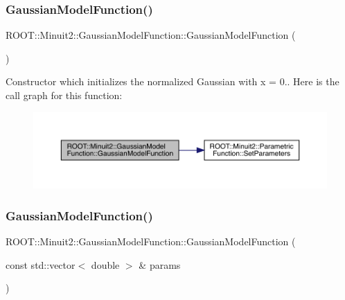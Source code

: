 \subsubsection{\texorpdfstring{GaussianModelFunction()}{GaussianModelFunction()}\hspace{0.1cm}{\footnotesize\ttfamily [1/2]}}
{\footnotesize\ttfamily R\+O\+O\+T\+::\+Minuit2\+::\+Gaussian\+Model\+Function\+::\+Gaussian\+Model\+Function (\begin{DoxyParamCaption}{ }\end{DoxyParamCaption})\hspace{0.3cm}{\ttfamily [inline]}}

Constructor which initializes the normalized Gaussian with x = 0.. Here is the call graph for this function\+:\nopagebreak
\begin{figure}[H]
\begin{center}
\leavevmode
\includegraphics[width=350pt]{d4/df6/classROOT_1_1Minuit2_1_1GaussianModelFunction_aebecd6f3f9e7b6e7d6787f38cfc84cdc_cgraph}
\end{center}
\end{figure}
\mbox{\label{classROOT_1_1Minuit2_1_1GaussianModelFunction_ab766a76f32f2369508bde703519cc049}} 
\subsubsection{\texorpdfstring{GaussianModelFunction()}{GaussianModelFunction()}\hspace{0.1cm}{\footnotesize\ttfamily [2/2]}}
{\footnotesize\ttfamily R\+O\+O\+T\+::\+Minuit2\+::\+Gaussian\+Model\+Function\+::\+Gaussian\+Model\+Function (\begin{DoxyParamCaption}\item[{const std\+::vector$<$ double $>$ \&}]{params }\end{DoxyParamCaption})\hspace{0.3cm}{\ttfamily [inline]}}

